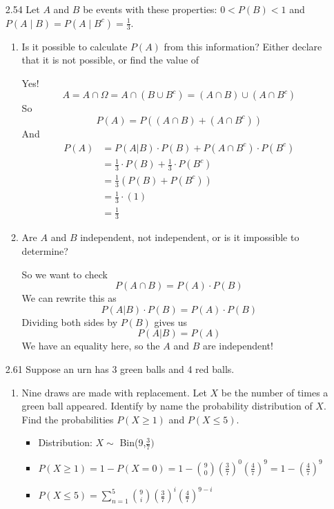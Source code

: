 \documentclass[10pt]{article}
\begin{document}
\begin{itemize}
\newpage
  \item[2.54] Let $A$ and $B$ be events with these properties: $0<P(B)<1$
    and $P(A \mid B)=P\left(A \mid B^{c}\right)=\frac{1}{3}$.
    \begin{enumerate}
      \item Is it possible to calculate $P(A)$ from this information?
        Either declare that it is not possible, or find the value of

        Yes!
        \[ A = A \cap \Omega = A \cap (B \cup B^c) = (A \cap B) \cup (A \cap B^c)\]
        So
        \[ P(A) = P((A \cap B) + (A \cap B^c))\]
        And
        \begin{align*}
          P(A) &= P(A | B) \cdot P(B) + P(A \cap B^c) \cdot P(B^c) \\
               &= \frac{1}{3}  \cdot P(B) + \frac{1}{3} \cdot P(B^c) \\
               &= \frac{1}{3}  ( P(B) + P(B^c) ) \\
               &= \frac{1}{3}  \cdot ( 1 ) \\
               &= \frac{1}{3}
        \end{align*}

      \item Are $A$ and $B$ independent, not independent, or is it
        impossible to determine?

        So we want to check
        \[ P(A \cap B) = P(A) \cdot P(B) \]
        We can rewrite this as
          \[ P(A|B) \cdot P(B) = P(A) \cdot P(B) \]
        Dividing both sides by $P(B)$ gives us
            \[ P(A|B) = P(A) \]
        We have an equality here, so the $A$ and $B$ are independent!

    \end{enumerate}

\newpage
  \item[2.61] Suppose an urn has 3 green balls and 4 red balls.
    \begin{enumerate}
      \item Nine draws are made with replacement. Let $X$ be the number
        of times a green ball appeared. Identify by name the probability
        distribution of $X$. Find the probabilities $P(X \geq 1)$ and
        $P(X \leq 5)$.

        \begin{itemize}
          \item Distribution: $X \sim$ Bin(9,$\frac{3}{7})$
          \item $P(X \geq 1) = 1- P(X=0) = 1 -
            \binom{9}{0} \left( \frac{3}{7} \right)^0
                        \left( \frac{4}{7} \right)^9 = 1 - \left( \frac{4}{7} \right)^9 $
          \item $P(X \leq 5) = \sum^{5}_{n=1} \binom{9}{i}  
                           \left( \frac{3}{7} \right)^i
                           \left( \frac{4}{7} \right)^{9-i}
                       $
        \end{itemize}


\end{enumerate}
\end{itemize}
\end{document}
